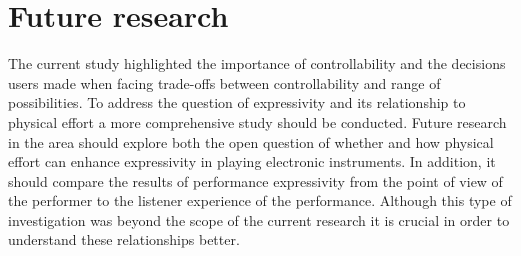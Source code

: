 \documentclass{sigchi}
\begin{document}
\section{Future research}

The current study highlighted the importance of controllability and the decisions users made when facing trade-offs between controllability and range of possibilities.
To address the question of expressivity and its relationship to physical effort a more comprehensive study should be conducted.
Future research in the area should explore both the open question of whether and how physical effort can enhance expressivity in playing electronic instruments.
In addition, it should compare the results of performance expressivity from the point of view of the performer to the listener experience of the performance.
Although this type of investigation was beyond the scope of the current research it is crucial in order to understand these relationships better.

\balance{}



\end{document}
